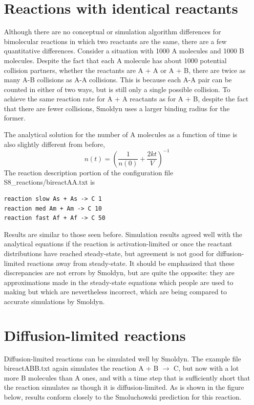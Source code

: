 \documentclass {scrbook}
\begin{document}
\section{Reactions with identical reactants}

Although there are no conceptual or simulation algorithm differences for bimolecular reactions in which two reactants are the same, there are a few quantitative differences. Consider a situation with 1000 A molecules and 1000 B molecules. Despite the fact that each A molecule has about 1000 potential collision partners, whether the reactants are A + A or A + B, there are twice as many A-B collisions as A-A collisions. This is because each A-A pair can be counted in either of two ways, but is still only a single possible collision. To achieve the same reaction rate for A + A reactants as for A + B, despite the fact that there are fewer collisions, Smoldyn uses a larger binding radius for the former.

The analytical solution for the number of A molecules as a function of time is also slightly different from before,
$$n(t) = \left(\frac{1}{n(0)} + \frac{2kt}{V} \right)^{-1}$$
The reaction description portion of the configuration file S8\_reactions/bireactAA.txt is

\begin{lstlisting}[style=SSAC]
reaction slow As + As -> C 1
reaction med Am + Am -> C 10
reaction fast Af + Af -> C 50
\end{lstlisting}
Results are similar to those seen before. Simulation results agreed well with the analytical equations if the reaction is activation-limited or once the reactant distributions have reached steady-state, but agreement is not good for diffusion-limited reactions away from steady-state. It should be emphasized that these discrepancies are not errors by Smoldyn, but are quite the opposite: they are approximations made in the steady-state equations which people are used to making but which are nevertheless incorrect, which are being compared to accurate simulations by Smoldyn.

\section{Diffusion-limited reactions}

Diffusion-limited reactions can be simulated well by Smoldyn. The example file bireactABB.txt again simulates the reaction A + B $\rightarrow$ C, but now with a lot more B molecules than A ones, and with a time step that is sufficiently short that the reaction simulates as though it is diffusion-limited. As is shown in the figure below, results conform closely to the Smoluchowski prediction for this reaction.
\end{document}
